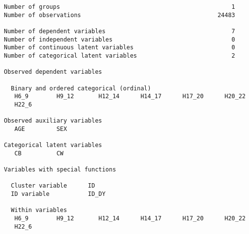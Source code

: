 \documentclass[]{article}
\begin{document}
\begin{verbatim}
Number of groups                                                 1
Number of observations                                       24483

Number of dependent variables                                    7
Number of independent variables                                  0
Number of continuous latent variables                            0
Number of categorical latent variables                           2

Observed dependent variables

  Binary and ordered categorical (ordinal)
   H6_9        H9_12       H12_14      H14_17      H17_20      H20_22
   H22_6

Observed auxiliary variables
   AGE         SEX

Categorical latent variables
   CB          CW

Variables with special functions

  Cluster variable      ID
  ID variable           ID_DY

  Within variables
   H6_9        H9_12       H12_14      H14_17      H17_20      H20_22
   H22_6



\end{verbatim}
\end{document}
